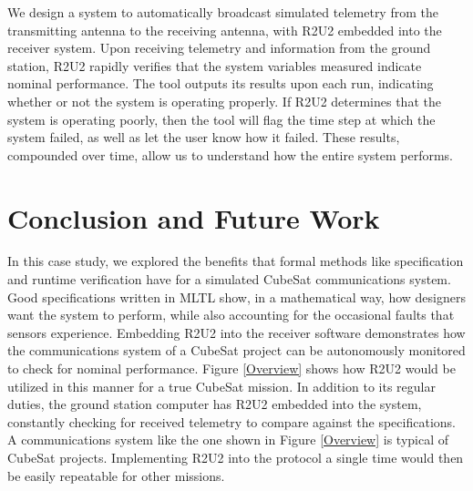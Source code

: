 \documentclass[conf]{new-aiaa}
\begin{document}
We design a system to automatically broadcast simulated telemetry from the transmitting antenna to the receiving antenna, with R2U2 embedded into the receiver system. Upon receiving telemetry and information from the ground station, R2U2 rapidly verifies that the system variables measured indicate nominal performance. The tool outputs its results upon each run, indicating whether or not the system is operating properly. If R2U2 determines that the system is operating poorly, then the tool will flag the time step at which the system failed, as well as let the user know how it failed. These results, compounded over time, allow us to understand how the entire system performs. 



\section{Conclusion and Future Work}

In this case study, we explored the benefits that formal methods like specification and runtime verification have for a simulated CubeSat communications system. Good specifications written in MLTL show, in a mathematical way, how designers want the system to perform, while also accounting for the occasional faults that sensors experience. Embedding R2U2 into the receiver software demonstrates how the communications system of a CubeSat project can be autonomously monitored to check for nominal performance. Figure \ref{Overview} shows how R2U2 would be utilized in this manner for a true CubeSat mission. In addition to its regular duties, the ground station computer has R2U2 embedded into the system, constantly checking for received telemetry to compare against the specifications. A communications system like the one shown in Figure \ref{Overview} is typical of CubeSat projects. Implementing R2U2 into the protocol a single time would then be easily repeatable for other missions.
\end{document}
